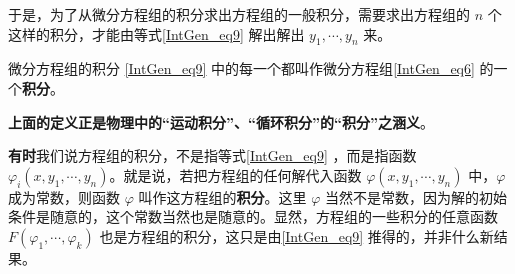 于是，为了从微分方程组的积分求出方程组的一般积分，需要求出方程组的 $n$ 个这样的积分，才能由等式\autoref{IntGen_eq9} 解出解出 $y_1,\cdots,y_n$ 来。
\begin{definition}{微分方程组的积分}\label{IntGen_def1}
\autoref{IntGen_eq9} 中的每一个都叫作微分方程组\autoref{IntGen_eq6} 的一个\textbf{积分}。
\end{definition}
\textbf{上面的定义正是物理中的“运动积分”、“循环积分”的“积分”之涵义}。

\textbf{有时}我们说方程组的积分，不是指等式\autoref{IntGen_eq9} ，而是指函数 $\varphi_i(x,y_1,\cdots,y_n)$。就是说，若把方程组的任何解代入函数 $\varphi(x,y_1,\cdots,y_n)$ 中，$\varphi$ 成为常数，则函数 $\varphi$ 叫作这方程组的\textbf{积分}。这里 $\varphi$ 当然不是常数，因为解的初始条件是随意的，这个常数当然也是随意的。显然，方程组的一些积分的任意函数 $F(\varphi_1,\cdots,\varphi_k)$ 也是方程组的积分，这只是由\autoref{IntGen_eq9} 推得的，并非什么新结果。
